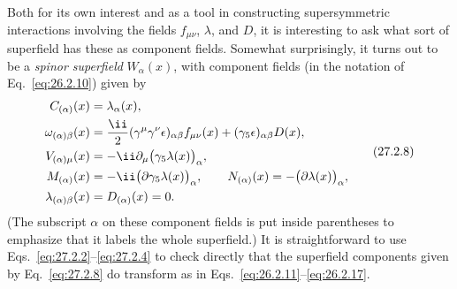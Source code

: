 Both for its own interest and as a tool in constructing supersymmetric
interactions involving the fields \(f_{\mu\nu}\), \(\lambda\), and \(D\),
it is interesting to ask what sort of superfield has these as component
fields. Somewhat surprisingly, it turns out to be a \textit{spinor
superfield} \(W_\alpha(x)\), with component fields (in the notation of
Eq.~\eqref{eq:26.2.10}) given by
\begin{equation}
  \begin{aligned}
  C_{(\alpha)}(x)&=\lambda_\alpha(x),
  \\
  \omega_{(\alpha)\beta}(x)
  &=\frac{\ii}{2}(\gamma^\mu\gamma^\nu\epsilon)_{\alpha\beta}
    f_{\mu\nu}(x)+(\gamma_5\epsilon)_{\alpha\beta}D(x),
  \\
  V_{(\alpha)\mu}(x)
  &=-\ii\partial_\mu\bigl(\gamma_5\lambda(x)\bigr)_\alpha,
  \\
  M_{(\alpha)}(x)
  &=-\ii\bigl(\sl{\partial}\gamma_5\lambda(x)\bigr)_\alpha,
  \qquad
  N_{(\alpha)}(x)=-\bigl(\sl{\partial}\lambda(x)\bigr)_\alpha,
  \\
  \lambda_{(\alpha)\beta}(x)&=D_{(\alpha)}(x)=0.
  \end{aligned}
  \tag{27.2.8}\label{eq:27.2.8}
\end{equation}
(The subscript \(\alpha\) on these component fields is put inside
parentheses to emphasize that it labels the whole superfield.) It is
straightforward to use Eqs.~\eqref{eq:27.2.2}--\eqref{eq:27.2.4} to
check directly that the superfield components given by
Eq.~\eqref{eq:27.2.8} do transform as in
Eqs.~\eqref{eq:26.2.11}--\eqref{eq:26.2.17}.

